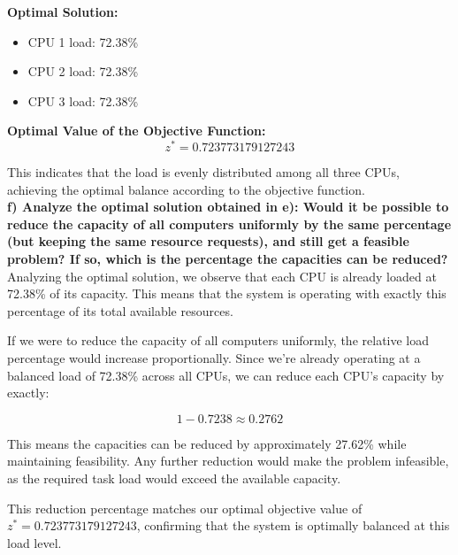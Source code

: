 \documentclass{article}
\begin{document}
\medskip

\textbf{Optimal Solution:}

\begin{itemize}
    \item CPU 1 load: 72.38\%
    \item CPU 2 load: 72.38\%
    \item CPU 3 load: 72.38\%
\end{itemize}

\textbf{Optimal Value of the Objective Function:} 
\[
z^* = 0.723773179127243
\]

This indicates that the load is evenly distributed among all three CPUs, achieving the optimal balance according to the objective function.
\\

\textbf{f) Analyze the optimal solution obtained in e): Would it be possible to reduce the capacity of all computers uniformly by the same percentage (but keeping the same resource requests), and still get a feasible problem? If so, which is the percentage the capacities can be reduced?}\\

Analyzing the optimal solution, we observe that each CPU is already loaded at 72.38\% of its capacity. This means that the system is operating with exactly this percentage of its total available resources.

If we were to reduce the capacity of all computers uniformly, the relative load percentage would increase proportionally. Since we're already operating at a balanced load of 72.38\% across all CPUs, we can reduce each CPU's capacity by exactly:

\[ 1 - 0.7238 \approx 0.2762 \]

This means the capacities can be reduced by approximately 27.62\% while maintaining feasibility. Any further reduction would make the problem infeasible, as the required task load would exceed the available capacity.

This reduction percentage matches our optimal objective value of $z^* = 0.723773179127243$, confirming that the system is optimally balanced at this load level.
\end{document}
